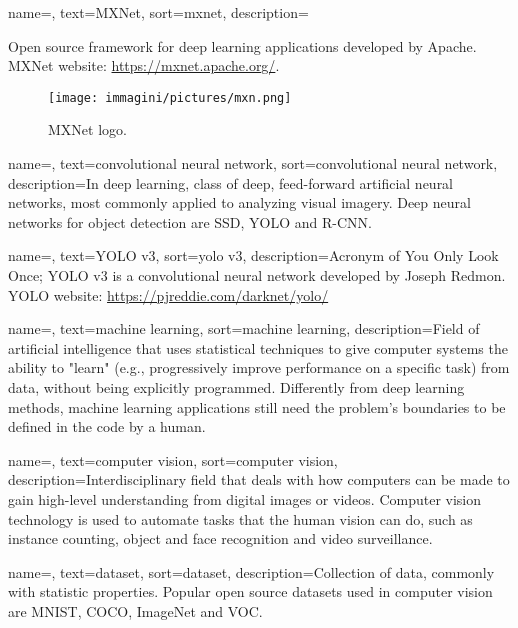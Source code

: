 {
	name=,
	text=MXNet,
	sort=mxnet,
	description={Open source framework for deep learning applications developed by Apache. MXNet website: \url{https://mxnet.apache.org/}.
\begin{figure}[htbp]
\begin{center}
\texttt{[image: immagini/pictures/mxn.png]} 
\caption{MXNet logo.}
\end{center}
\end{figure}}
}

{
	name=,
	text=convolutional neural network,
	sort=convolutional neural network,
	description={In deep learning, class of deep, feed-forward artificial neural networks, most commonly applied to analyzing visual imagery. Deep neural networks for object detection are SSD, YOLO and R-CNN.}
}

{
	name=,
	text=YOLO v3,
	sort=yolo v3,
	description={Acronym of You Only Look Once; YOLO v3 is a convolutional neural network developed by Joseph Redmon. YOLO website: \url{https://pjreddie.com/darknet/yolo/}}
}

{
	name=,
	text=machine learning,
	sort=machine learning,
	description={Field of artificial intelligence that uses statistical techniques to give computer systems the ability to "learn" (e.g., progressively improve performance on a specific task) from data, without being explicitly programmed. Differently from deep learning methods, machine learning applications still need the problem's boundaries to be defined in the code by a human.}
}

{
	name=,
	text=computer vision,
	sort=computer vision,
	description={Interdisciplinary field that deals with how computers can be made to gain high-level understanding from digital images or videos. Computer vision technology is used to automate tasks that the human vision can do, such as instance counting, object and face recognition and video surveillance.}
}

{
	name=,
	text=dataset,
	sort=dataset,
	description={Collection of data, commonly with statistic properties. Popular open source datasets used in computer vision are MNIST, COCO, ImageNet and VOC.}
}

